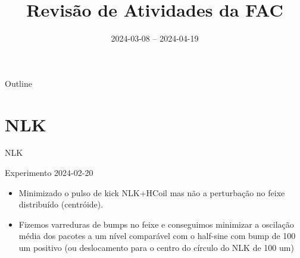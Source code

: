 \documentclass{beamer}					  %
\title{Revisão de Atividades da FAC}	%
\institute{LNLS.DAC.FAC}				%
\date{2024-03-08 -- 2024-04-19}			%
\begin{document}
\begin{frame}
  \titlepage
  \href{https://github.com/lnls-fac/doc-review-dac-fac}{}
  \href{https://www.overleaf.com/read/sbdjxtzfchrm}{}
\end{frame}

\begin{frame}{Outline}
  \tableofcontents
\end{frame}








\section{NLK}

\begin{frame}{NLK}
    \vspace{0.2 cm}
    \large{
    Experimento 2024-02-20
    \vspace{0.4 cm}
    \begin{itemize}
            \item Minimizado o pulso de kick NLK+HCoil mas não a perturbação no feixe distribuído (centróide). \vspace{0.4 cm}
            \item Fizemos varreduras de bumps no feixe e conseguimos minimizar a oscilação média dos pacotes a um nível comparável com o half-sine com bump de 100 um positivo (ou deslocamento para o centro do círculo do NLK de 100 um)
    \end{itemize}
    }
\end{frame}
\end{document}
